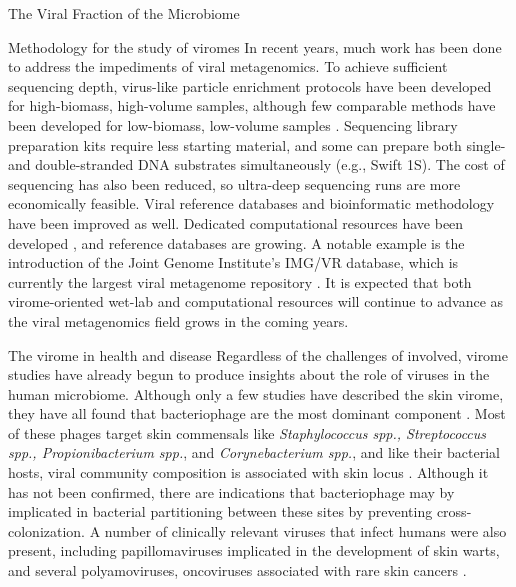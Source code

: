 \documentclass[oneside,12pt,final]{sty/ucthesis-CA2012}
\begin{document}
\begin{mainmatter}
\begin{section}{The Viral Fraction of the Microbiome}
\begin{subsection}{Methodology for the study of viromes}
In recent years, much work has been done to address the impediments of viral metagenomics. To achieve sufficient sequencing depth, virus-like particle enrichment protocols have been developed for high-biomass, high-volume samples, although few comparable methods have been developed for low-biomass, low-volume samples \cite{RN130, RN131}. Sequencing library preparation kits require less starting material, and some can prepare both single- and double-stranded DNA substrates simultaneously (e.g., Swift 1S). The cost of sequencing has also been reduced, so ultra-deep sequencing runs are more economically feasible. Viral reference databases and bioinformatic methodology have been improved as well. Dedicated computational resources have been developed \cite{RN132, RN133, RN134, RN135, RN136, RN172, RN173}, and reference databases are growing. A notable example is the introduction of the Joint Genome Institute's IMG/VR database, which is currently the largest viral metagenome repository \cite{RN137}. It is expected that both virome-oriented wet-lab and computational resources will continue to advance as the viral metagenomics field grows in the coming years.
\end{subsection}


\begin{subsection}{The virome in health and disease}
Regardless of the challenges of involved, virome studies have already begun to produce insights about the role of viruses in the human microbiome. Although only a few studies have described the skin virome, they have all found that bacteriophage are the most dominant component \cite{RN166, RN56}. Most of these phages target skin commensals like \textit{Staphylococcus spp., Streptococcus spp., Propionibacterium spp.}, and \textit{Corynebacterium spp.}, and like their bacterial hosts, viral community composition is associated with skin locus \cite{RN166, RN56, RN55}. Although it has not been confirmed, there are indications that bacteriophage may by implicated in bacterial partitioning between these sites by preventing cross-colonization. A number of clinically relevant viruses that infect humans were also present, including papillomaviruses implicated in the development of skin warts, and several polyamoviruses, oncoviruses associated with rare skin cancers \cite{RN166, RN56}.


\end{subsection}
\end{section}
\end{mainmatter}
\end{document}
